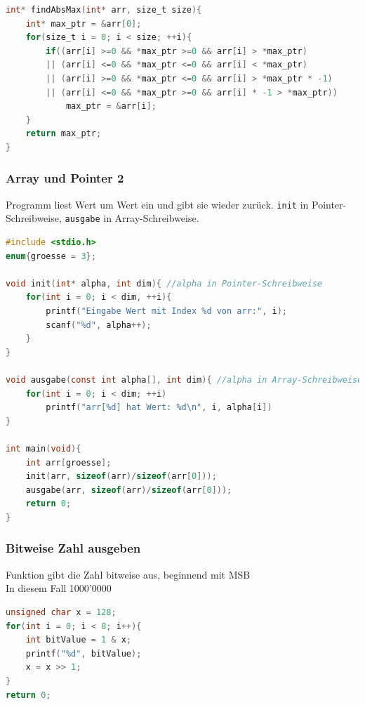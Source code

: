 			\begin{lstlisting}[language=C]
int* findAbsMax(int* arr, size_t size){
	int* max_ptr = &arr[0];
	for(size_t i = 0; i < size; ++i){
		if((arr[i] >=0 && *max_ptr >=0 && arr[i] > *max_ptr)
		|| (arr[i] <=0 && *max_ptr <=0 && arr[i] < *max_ptr)
		|| (arr[i] >=0 && *max_ptr <=0 && arr[i] > *max_ptr * -1)
		|| (arr[i] <=0 && *max_ptr >=0 && arr[i] * -1 > *max_ptr))
			max_ptr = &arr[i];
	}
	return max_ptr;
}
			\end{lstlisting}
		
		\subsubsection{Array und Pointer 2}
			Programm liest Wert um Wert ein und gibt sie wieder zurück. \verb|init| in Pointer-Schreibweise, \verb|ausgabe| in Array-Schreibweise.
			\begin{lstlisting}[language=C]
#include <stdio.h>
enum{groesse = 3};

void init(int* alpha, int dim){ //alpha in Pointer-Schreibweise
	for(int i = 0; i < dim, ++i){
		printf("Eingabe Wert mit Index %d von arr:", i);
		scanf("%d", alpha++);
	}
}

void ausgabe(const int alpha[], int dim){ //alpha in Array-Schreibweise
	for(int i = 0; i < dim; ++i)
		printf("arr[%d] hat Wert: %d\n", i, alpha[i])
}

int main(void){
	int arr[groesse];
	init(arr, sizeof(arr)/sizeof(arr[0]));
	ausgabe(arr, sizeof(arr)/sizeof(arr[0]));
	return 0;
}
			\end{lstlisting}

		\subsubsection{Bitweise Zahl ausgeben}
			Funktion gibt die Zahl bitweise aus, beginnend mit MSB\\
			In diesem Fall 1000'0000
			\begin{lstlisting}[language=C]
unsigned char x = 128;
for(int i = 0; i < 8; i++){
	int bitValue = 1 & x;
	printf("%d", bitValue);
	x = x >> 1;
}
return 0;
			\end{lstlisting}